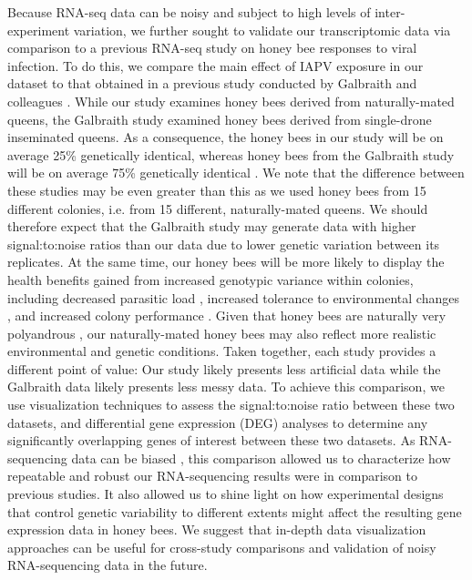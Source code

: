 \documentclass{bmcart}
\begin{document}
\begin{linenumbers}
\begin{doublespacing}
Because RNA-seq data can be noisy and subject to high levels of inter-experiment variation, we further sought to validate our transcriptomic data via comparison to a previous RNA-seq study on honey bee responses to viral infection. To do this, we compare the main effect of IAPV exposure in our dataset to that obtained in a previous study conducted by Galbraith and colleagues \cite{galbraith}. While our study examines honey bees derived from naturally-mated queens, the Galbraith study examined honey bees derived from single-drone inseminated queens. As a consequence, the honey bees in our study will be on average 25\% genetically identical, whereas honey bees from the Galbraith study will be on average 75\% genetically identical \cite{sisters}. We note that the difference between these studies may be even greater than this as we used honey bees from 15 different colonies, i.e. from 15 different, naturally-mated queens. We should therefore expect that the Galbraith study may generate data with higher signal:to:noise ratios than our data due to lower genetic variation between its replicates. At the same time, our honey bees will be more likely to display the health benefits gained from increased genotypic variance within colonies, including decreased parasitic load \cite{multParasite}, increased tolerance to environmental changes \cite{divHyp2}, and increased colony performance \cite{geneticDiverse, geneticDiverse2}. Given that honey bees are naturally very polyandrous \cite{patriline}, our naturally-mated honey bees may also reflect more realistic environmental and genetic conditions. Taken together, each study provides a different point of value: Our study likely presents less artificial data while the Galbraith data likely presents less messy data. To achieve this comparison, we use visualization techniques to assess the signal:to:noise ratio between these two datasets, and differential gene expression (DEG) analyses to determine any significantly overlapping genes of interest between these two datasets. As RNA-sequencing data can be biased \cite{biased1, biased2, biased3}, this comparison allowed us to characterize how repeatable and robust our RNA-sequencing results were in comparison to previous studies. It also allowed us to shine light on how experimental designs that control genetic variability to different extents might affect the resulting gene expression data in honey bees. We suggest that in-depth data visualization approaches can be useful for cross-study comparisons and validation of noisy RNA-sequencing data in the future.


\end{doublespacing}
\end{linenumbers}
\end{document}
